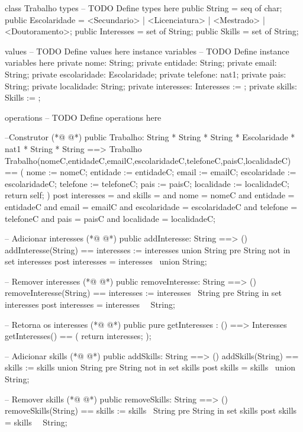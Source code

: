 \begin{vdmpp}[breaklines=true]
class Trabalho
types
-- TODO Define types here
 public String = seq of char;
 public Escolaridade = <Secundario> | <Licenciatura> | <Mestrado> | <Doutoramento>;
 public Interesses = set of String;
 public Skills = set of String;
 
values
-- TODO Define values here
instance variables
-- TODO Define instance variables here
 private nome: String;
 private entidade: String;
 private email: String;
 private escolaridade: Escolaridade;
 private telefone: nat1;
 private pais: String;
 private localidade: String;
 private interesses: Interesses := {};
 private skills: Skills := {};
 
operations
-- TODO Define operations here

 --Construtor
(*@
\label{Trabalho:27}
@*)
 public Trabalho: String * String * String * Escolaridade * nat1 * String * String ==> Trabalho
 Trabalho(nomeC,entidadeC,emailC,escolaridadeC,telefoneC,paisC,localidadeC) == (
  nome := nomeC;
  entidade := entidadeC;
  email := emailC;
  escolaridade := escolaridadeC;
  telefone := telefoneC;
  pais := paisC;
  localidade := localidadeC;
  return self;
 )
 post interesses = {} and
   skills = {} and
   nome = nomeC and
   entidade = entidadeC and
   email = emailC and
   escolaridade = escolaridadeC and
   telefone = telefoneC and
   pais = paisC and
   localidade = localidadeC;
   
 -- Adicionar interesses
(*@
\label{addInteresse:49}
@*)
 public addInteresse: String ==> ()
 addInteresse(String) == interesses := interesses union {String}
 pre String not in set interesses
 post interesses = interesses~ union {String};
 
 -- Remover interesses
(*@
\label{removeInteresse:55}
@*)
 public removeInteresse: String ==> ()
 removeInteresse(String) == interesses := interesses \ {String}
 pre String in set interesses
 post interesses = interesses~ \ {String};
 
 -- Retorna os interesses
(*@
\label{getInteresses:61}
@*)
 public pure getInteresses : () ==> Interesses
 getInteresses() ==
 (
  return interesses;
 );
 
 -- Adicionar skills
(*@
\label{addSkills:68}
@*)
 public addSkills: String ==> ()
 addSkills(String) == skills := skills union {String}
 pre String not in set skills
 post skills = skills~ union {String};
 
 -- Remover skills
(*@
\label{removeSkills:74}
@*)
 public removeSkills: String ==> ()
 removeSkills(String) == skills := skills \ {String}
 pre String in set skills
 post skills = skills~ \ {String};
 

\end{vdmpp}
